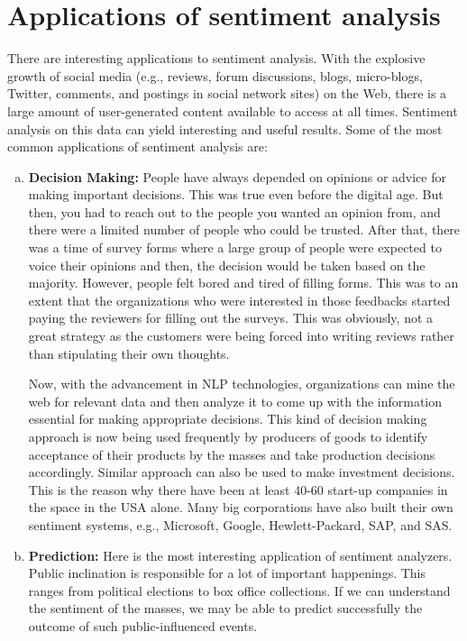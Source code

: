 \section{Applications of sentiment analysis}

There are interesting applications to sentiment analysis. With the explosive growth of social media (e.g., reviews, forum discussions,
blogs, micro-blogs, Twitter, comments, and postings in social network sites)
on the Web, there is a large amount of user-generated content available to access at all times. Sentiment analysis on this data can yield interesting and useful results. Some 
of the most common applications of sentiment analysis are:

\begin{enumerate}[(a)]%
\setlength{\itemsep}{15pt}
\item \textbf{Decision Making: } People have always depended on opinions or advice for making important decisions. This was true even before the digital age. 
But then, you had to reach out to the people you wanted an opinion from, and there were a limited number of people who could be trusted. After that, there was a time of
survey forms where a large group of people were expected to voice their opinions and then, the decision would be taken based on the majority. However, people felt bored
and tired of filling forms. This was to an extent that the organizations who were interested in those feedbacks started paying the reviewers for filling out the surveys.
This was obviously, not a great strategy as the customers were being forced into writing reviews rather than stipulating their own thoughts.

\vspace{8mm}

Now, with the advancement in NLP technologies, organizations can mine the web for relevant data and then analyze it to come up with the information essential for making 
appropriate decisions. This kind of decision making approach is now being used frequently by producers of goods to identify acceptance of their products by the masses
and take production decisions accordingly. Similar approach can also be used to make investment decisions. This is the reason why there have been at least 40-60 start-up
companies in the space in the USA alone. Many big corporations have also built their own sentiment systems, e.g., Microsoft, Google, Hewlett-Packard, SAP, and SAS.

\item \textbf{Prediction: } Here is the most interesting application of sentiment analyzers. Public inclination is responsible for a lot of important happenings.
This ranges from political elections to box office collections. If we can understand the sentiment of the masses, we may be able to predict successfully the outcome
of such public-influenced events.


\end{enumerate}

